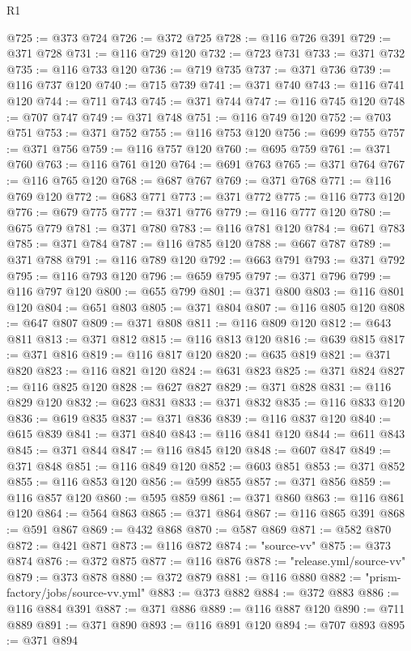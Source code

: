 \begin{lexlean}{R1}
\begin{coremodule}
@725 := @373 @724
@726 := @372 @725
@728 := @116 @726 @391
@729 := @371 @728
@731 := @116 @729 @120
@732 := @723 @731
@733 := @371 @732
@735 := @116 @733 @120
@736 := @719 @735
@737 := @371 @736
@739 := @116 @737 @120
@740 := @715 @739
@741 := @371 @740
@743 := @116 @741 @120
@744 := @711 @743
@745 := @371 @744
@747 := @116 @745 @120
@748 := @707 @747
@749 := @371 @748
@751 := @116 @749 @120
@752 := @703 @751
@753 := @371 @752
@755 := @116 @753 @120
@756 := @699 @755
@757 := @371 @756
@759 := @116 @757 @120
@760 := @695 @759
@761 := @371 @760
@763 := @116 @761 @120
@764 := @691 @763
@765 := @371 @764
@767 := @116 @765 @120
@768 := @687 @767
@769 := @371 @768
@771 := @116 @769 @120
@772 := @683 @771
@773 := @371 @772
@775 := @116 @773 @120
@776 := @679 @775
@777 := @371 @776
@779 := @116 @777 @120
@780 := @675 @779
@781 := @371 @780
@783 := @116 @781 @120
@784 := @671 @783
@785 := @371 @784
@787 := @116 @785 @120
@788 := @667 @787
@789 := @371 @788
@791 := @116 @789 @120
@792 := @663 @791
@793 := @371 @792
@795 := @116 @793 @120
@796 := @659 @795
@797 := @371 @796
@799 := @116 @797 @120
@800 := @655 @799
@801 := @371 @800
@803 := @116 @801 @120
@804 := @651 @803
@805 := @371 @804
@807 := @116 @805 @120
@808 := @647 @807
@809 := @371 @808
@811 := @116 @809 @120
@812 := @643 @811
@813 := @371 @812
@815 := @116 @813 @120
@816 := @639 @815
@817 := @371 @816
@819 := @116 @817 @120
@820 := @635 @819
@821 := @371 @820
@823 := @116 @821 @120
@824 := @631 @823
@825 := @371 @824
@827 := @116 @825 @120
@828 := @627 @827
@829 := @371 @828
@831 := @116 @829 @120
@832 := @623 @831
@833 := @371 @832
@835 := @116 @833 @120
@836 := @619 @835
@837 := @371 @836
@839 := @116 @837 @120
@840 := @615 @839
@841 := @371 @840
@843 := @116 @841 @120
@844 := @611 @843
@845 := @371 @844
@847 := @116 @845 @120
@848 := @607 @847
@849 := @371 @848
@851 := @116 @849 @120
@852 := @603 @851
@853 := @371 @852
@855 := @116 @853 @120
@856 := @599 @855
@857 := @371 @856
@859 := @116 @857 @120
@860 := @595 @859
@861 := @371 @860
@863 := @116 @861 @120
@864 := @564 @863
@865 := @371 @864
@867 := @116 @865 @391
@868 := @591 @867
@869 := @432 @868
@870 := @587 @869
@871 := @582 @870
@872 := @421 @871
@873 := @116 @872
@874 := "source-vv"
@875 := @373 @874
@876 := @372 @875
@877 := @116 @876
@878 := "release.yml/source-vv"
@879 := @373 @878
@880 := @372 @879
@881 := @116 @880
@882 := "prism-factory/jobs/source-vv.yml"
@883 := @373 @882
@884 := @372 @883
@886 := @116 @884 @391
@887 := @371 @886
@889 := @116 @887 @120
@890 := @711 @889
@891 := @371 @890
@893 := @116 @891 @120
@894 := @707 @893
@895 := @371 @894

\end{coremodule}
\end{lexlean}
